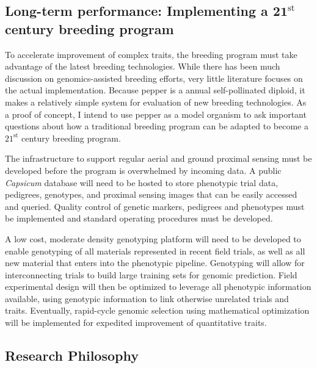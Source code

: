 \documentclass[11pt]{article}
\begin{document}
\subsection*{Long-term performance: Implementing a $\mathbf{21}^\text{st}$ century breeding program}

To accelerate improvement of complex traits, the breeding program must take advantage of the latest breeding technologies. While there has been much discussion on genomics-assisted breeding efforts, very little literature focuses on the actual implementation. Because pepper is a annual self-pollinated diploid, it makes a relatively simple system for evaluation of new breeding technologies. As a proof of concept, I intend to use pepper as a model organism to ask important questions about how a traditional breeding program can be adapted to become a $21^\text{st}$ century breeding program. 

The infrastructure to support regular aerial and ground proximal sensing must be developed before the program is overwhelmed by incoming data. A public \emph{Capsicum} database will need to be hosted to store phenotypic trial data, pedigrees, genotypes, and proximal sensing images that can be easily accessed and queried. Quality control of genetic markers, pedigrees and phenotypes must be implemented and standard operating procedures must be developed.


A low cost, moderate density genotyping platform will need to be developed to enable genotyping of all materials represented in recent field trials, as well as all new material that enters into the phenotypic pipeline. Genotyping will allow for interconnecting trials to build large training sets for genomic prediction. Field experimental design will then be optimized to leverage all phenotypic information available, using genotypic information to link otherwise unrelated trials and traits. Eventually, rapid-cycle genomic selection using mathematical optimization will be implemented for expedited improvement of quantitative traits.




\subsection*{Research Philosophy}
\end{document}
